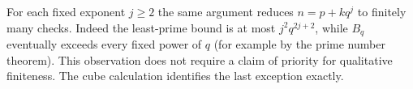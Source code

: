 For each fixed exponent $j\ge2$ the same argument reduces
$n=p+kq^j$ to finitely many checks. Indeed the least-prime bound is
at most $j^2 q^{2j+2}$, while $B_q$ eventually exceeds every fixed
power of $q$ (for example by the prime number theorem). This observation
does not require a claim of priority for qualitative finiteness. The
cube calculation identifies the last exception exactly.
